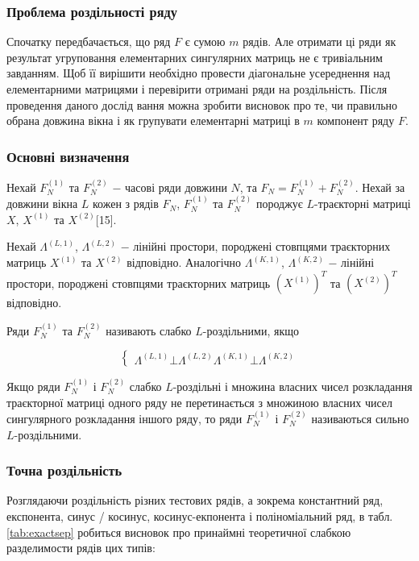 \subsubsection{Проблема роздільності ряду}

Спочатку передбачається, що ряд $F$ є сумою $m$ рядів. Але отримати ці ряди як результат угруповання елементарних сингулярних матриць не є тривіальним завданням. Щоб її вирішити необхідно провести діагональне усереднення над елементарними матрицями і перевірити отримані ряди на роздільність. Після проведення даного дослід вання можна зробити висновок про те, чи правильно обрана довжина вікна і як групувати елементарні матриці в $m$ компонент ряду $F$.

\subsubsection{Основні визначення}

Нехай $F_{N}^{(1)}$ та $F_{N}^{(2)}$ $-$ часові ряди довжини $N$, та $F_{N} = F_{N}^{(1)} + F_{N}^{(2)}$. Нехай за довжини вікна $L$ кожен з рядів $F_{N}$, $F_{N}^{(1)}$ та $F_{N}^{(2)}$ породжує $L$-траєкторні матриці $X$, $X^{(1)}$ та $X^{(2)}$[15].

Нехай $\Lambda^{(L,1)}$, $\Lambda^{(L,2)}$ $-$ лінійні простори, породжені стовпцями траєкторних матриць $X^{(1)}$ та $X^{(2)}$ відповідно. Аналогічно $\Lambda^{(K,1)}$, $\Lambda^{(K,2)}$ $-$ лінійні простори, породжені стовпцями траєкторних матриць $(X^{(1)})^{T}$ та $(X^{(2)})^{T}$ відповідно.

Ряди $F_{N}^{(1)}$ та $F_{N}^{(2)}$ називають слабко $L$-роздільними, якщо

\[
	\left\{
	\begin{aligned}
	\Lambda^{(L,1)} \bot \Lambda^{(L,2)}
	\Lambda^{(K,1)} \bot \Lambda^{(K,2)}
	\end{aligned}
	\right.
\]

Якщо ряди $F_{N}^{(1)}$ і $F_{N}^{(2)}$ слабко $L$-роздільні і множина власних чисел розкладання траєкторної матриці одного ряду не перетинається з множиною власних чисел сингулярного розкладання іншого ряду, то ряди $F_{N}^{(1)}$ і $F_{N}^{(2)}$ називаються сильно $L$-роздільними.

\subsubsection{Точна роздільність}

Розглядаючи роздільність різних тестових рядів, а зокрема константний ряд, експонента, синус / косинус, косинус-екпонента і поліноміальний ряд, в табл. \ref{tab:exactsep} робиться висновок про принаймні теоретичної слабкою разделимости рядів цих типів:

